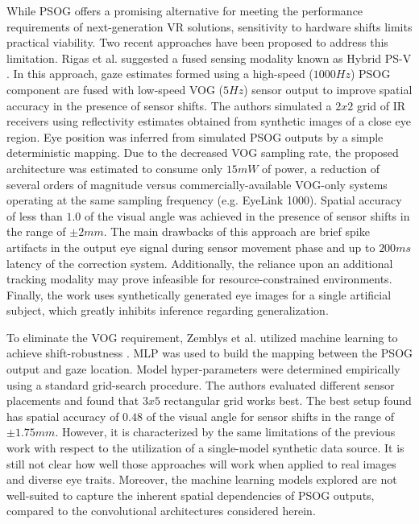 While PSOG offers a promising alternative for meeting the performance requirements of next-generation VR solutions, sensitivity to hardware shifts limits practical viability. Two recent approaches have been proposed to address this limitation. Rigas et al. suggested a fused sensing modality known as Hybrid PS-V  \cite{rigas2017hybrid}. In this approach, gaze estimates formed using a high-speed ($1000 Hz$) PSOG component are fused with low-speed VOG ($5Hz$) sensor output to improve spatial accuracy in the presence of sensor shifts. The authors simulated a $2x2$ grid of IR receivers using reflectivity estimates obtained from synthetic images of a close eye region. Eye position was inferred from simulated PSOG outputs by a simple deterministic mapping. Due to the decreased VOG sampling rate, the proposed architecture was estimated to consume only $15 mW$ of power, a reduction of several orders of magnitude versus commercially-available VOG-only systems operating at the same sampling frequency (e.g. EyeLink 1000). Spatial accuracy of less than $1.0$\textdegree{} of the visual angle was achieved in the presence of sensor shifts in the range of $\pm 2mm$. The main drawbacks of this approach are brief spike artifacts in the output eye signal during sensor movement phase and up to $200 ms$ latency of the correction system. Additionally, the reliance upon an additional tracking modality may prove infeasible for resource-constrained environments. Finally, the work uses synthetically generated eye images for a single artificial subject, which greatly inhibits inference regarding generalization.

To eliminate the VOG requirement, Zemblys et al. utilized machine learning to achieve shift-robustness \cite{zemblys2018making}. MLP was used to build the mapping between the PSOG output and gaze location. Model hyper-parameters were determined empirically using a standard grid-search procedure. The authors evaluated different sensor placements and found that $3x5$ rectangular grid works best. The best setup found has spatial accuracy of $0.48$\textdegree{} of the visual angle for sensor shifts in the range of $\pm 1.75mm$. However, it is characterized by the same limitations of the previous work with respect to the utilization of a single-model synthetic data source. It is still not clear how well those approaches will work when applied to real images and diverse eye traits. Moreover, the machine learning models explored are not well-suited to capture the inherent spatial dependencies of PSOG outputs, compared to the convolutional architectures considered herein. 

